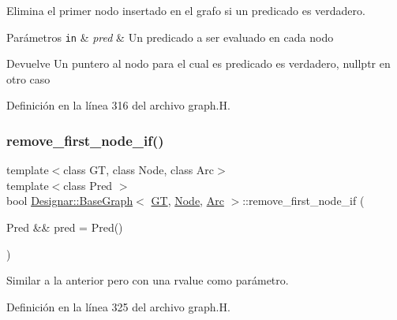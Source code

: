 Elimina el primer nodo insertado en el grafo si un predicado es verdadero. 


\begin{DoxyParams}[1]{Parámetros}
\mbox{\tt in}  & {\em pred} & Un predicado a ser evaluado en cada nodo \\
\hline
\end{DoxyParams}
\begin{DoxyReturn}{Devuelve}
Un puntero al nodo para el cual es predicado es verdadero, {\ttfamily nullptr} en otro caso 
\end{DoxyReturn}


Definición en la línea 316 del archivo graph.\+H.

\mbox{\label{class_designar_1_1_base_graph_aec049416b5240910cb04b1d6f55fcecf}} 
\subsubsection{\texorpdfstring{remove\+\_\+first\+\_\+node\+\_\+if()}{remove\_first\_node\_if()}\hspace{0.1cm}{\footnotesize\ttfamily [2/2]}}
{\footnotesize\ttfamily template$<$class GT, class Node, class Arc$>$ \\
template$<$class Pred $>$ \\
bool \hyperlink{class_designar_1_1_base_graph}{Designar\+::\+Base\+Graph}$<$ \hyperlink{demo-buildgraph_8_c_a3001c40d2c31ca87ed96cd7d1334a55e}{GT}, \hyperlink{namespace_designar_a5af326c65aa2bd26b26c410f2030d09e}{Node}, \hyperlink{namespace_designar_a3f55fb5513d62ff47cbc8f72b8e95d6f}{Arc} $>$\+::remove\+\_\+first\+\_\+node\+\_\+if (\begin{DoxyParamCaption}\item[{Pred \&\&}]{pred = {\ttfamily Pred()} }\end{DoxyParamCaption})\hspace{0.3cm}{\ttfamily [inline]}}



Similar a la anterior pero con una rvalue como parámetro. 



Definición en la línea 325 del archivo graph.\+H.

